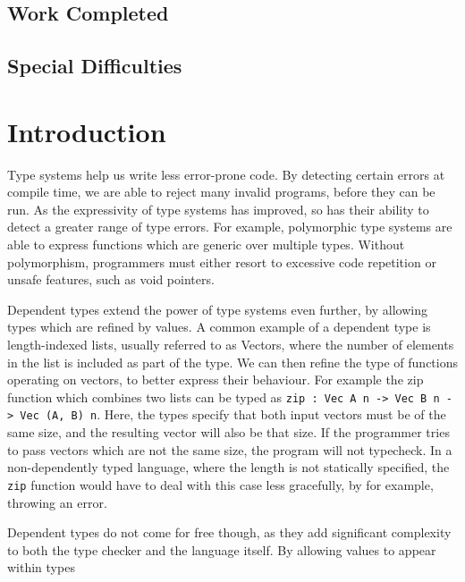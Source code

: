 \documentclass[12pt,a4paper,twoside]{report}
\begin{document}

\section*{Work Completed}


\section*{Special Difficulties}


\tableofcontents

\chapter{Introduction}
\pagestyle{headings}

Type systems help us write less error-prone code.
By detecting certain errors at compile time, we are able to reject many invalid programs, before they can be run.
As the expressivity of type systems has improved, so has their ability to detect a greater range of type errors.
For example, polymorphic type systems are able to express functions which are generic over multiple types.
Without polymorphism, programmers must either resort to excessive code repetition or unsafe features, such as void pointers.

Dependent types extend the power of type systems even further, by allowing types which are refined by values.
A common example of a dependent type is length-indexed lists, usually referred to as Vectors, where the number of elements in the list is included as part of the type.
We can then refine the type of functions operating on vectors, to better express their behaviour. For example the zip function which combines two lists can be typed as \lstinline{zip : Vec A n -> Vec B n -> Vec (A, B) n}.
Here, the types specify that both input vectors must be of the same size, and the resulting vector will also be that size.
If the programmer tries to pass vectors which are not the same size, the program will not typecheck.
In a non-dependently typed language, where the length is not statically specified, the \lstinline{zip} function would have to deal with this case less gracefully, by for example, throwing an error.

Dependent types do not come for free though, as they add significant complexity to both the type checker and the language itself. By allowing values to appear within types
\end{document}
